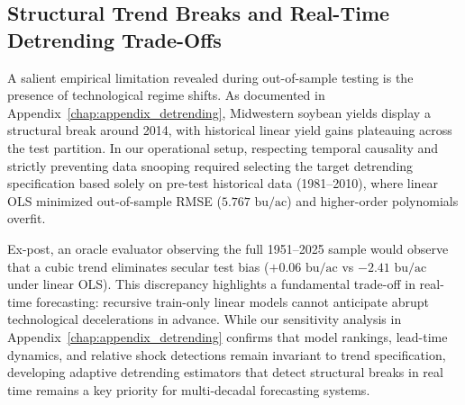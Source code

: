 \subsection{Structural Trend Breaks and Real-Time Detrending Trade-Offs}
A salient empirical limitation revealed during out-of-sample testing is the presence of technological regime shifts. As documented in Appendix~\ref{chap:appendix_detrending}, Midwestern soybean yields display a structural break around 2014, with historical linear yield gains plateauing across the test partition. In our operational setup, respecting temporal causality and strictly preventing data snooping required selecting the target detrending specification based solely on pre-test historical data (1981--2010), where linear OLS minimized out-of-sample RMSE ($5.767\text{ bu/ac}$) and higher-order polynomials overfit. 

Ex-post, an oracle evaluator observing the full 1951--2025 sample would observe that a cubic trend eliminates secular test bias ($+0.06\text{ bu/ac}$ vs $-2.41\text{ bu/ac}$ under linear OLS). This discrepancy highlights a fundamental trade-off in real-time forecasting: recursive train-only linear models cannot anticipate abrupt technological decelerations in advance. While our sensitivity analysis in Appendix~\ref{chap:appendix_detrending} confirms that model rankings, lead-time dynamics, and relative shock detections remain invariant to trend specification, developing adaptive detrending estimators that detect structural breaks in real time remains a key priority for multi-decadal forecasting systems.

